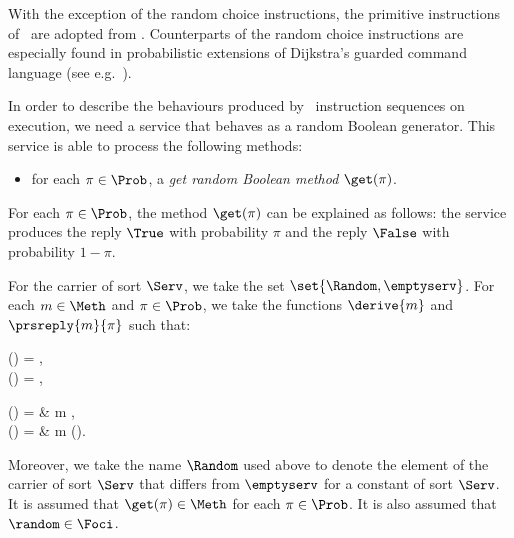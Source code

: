 \documentclass{llncs}
\begin{document}
With the exception of the random choice instructions, the primitive
instructions of \prPGLB\ are adopted from \PGLB.
Counterparts of the random choice instructions are especially found in
probabilistic extensions of Dijkstra's guarded command language 
(see e.g.~\cite{HSM97a}).

In order to describe the behaviours produced by \prPGLB\ instruction 
sequences on execution, we need a service that behaves as a random 
Boolean generator.
This service is able to process the following methods:
\begin{itemize}
\item
for each $\pi \in \Prob$, a \emph{get random Boolean method} 
$\get(\pi)$.
\end{itemize}
For each $\pi \in \Prob$, the method $\get(\pi)$ can be explained as 
follows: the service produces the reply $\True$ with probability $\pi$ 
and the reply $\False$ with probability $1 - \pi$.

For the carrier of sort $\Serv$, we take the set 
$\set{\Random,\emptyserv}$.
For each $m \in \Meth$ and $\pi \in \Prob$, we take the functions 
$\derive{m}$ and $\prsreply{m}{\pi}$ such that:
\begin{ldispl}
\begin{geqns}
\derive{\get(\pi)}(\Random)        = \Random\;, \\
\prsreply{\get(\pi)}{\pi}(\Random) = \True\;, 
\end{geqns}
\qquad
\begin{gceqns}
(\Random) = \emptyserv &  \; 
m \not\in \set{\get(\pi) \where \pi \in \Prob}\;, \\
(\Random) = \False &  \; 
m \neq \get(\pi)\;.
\end{gceqns}
\end{ldispl}Moreover, we take the name $\Random$ used above to denote the element of
the carrier of sort $\Serv$ that differs from $\emptyserv$ for a 
constant of sort $\Serv$.
It is assumed that $\get(\pi) \in \Meth$ for each $\pi \in \Prob$.
It is also assumed that $\random \in \Foci$.
\end{document}
